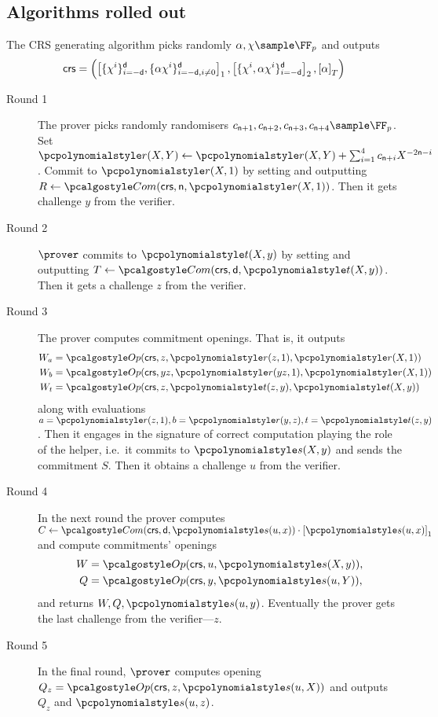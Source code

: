\let\accentvec\vec \documentclass[runningheads]{llncs}
\begin{document}
	\subsection{Algorithms rolled out}
	The CRS generating algorithm picks randomly $\alpha, \chi \sample \FF_p$ and
	outputs 
	\[
		\mathsf{crs} = \left( \left[\{\chi^i\}_{i = -\mathsf{d}}^{\mathsf{d}},
			\{\alpha \chi^i\}_{i = -\mathsf{d}, i \neq 0}^{\mathsf{d}}\right]_{1},
			\left[\{\chi^i, \alpha \chi^i\}_{i = - \mathsf{d}}^{\mathsf{d}}\right]_{2},
		\left[\alpha\right]_{T} \right)
	\]
\begin{description}
	\item[Round 1]
		The prover picks randomly randomisers $c_{\multconstr + 1}, c_{\multconstr + 2},
		c_{\multconstr + 3}, c_{\multconstr + 4} \sample \FF_p$. Set $\pr(X, Y)
		\gets \pr(X, Y) + \sum_{i = 1}^4 c_{\multconstr + i} X^{- 2 \multconstr -
		i}$. Commit to $\pr(X, 1)$ by setting and outputting $R \gets \com(\crs, \multconstr,
		\pr(X, 1))$.
		Then it gets challenge $y$ from the verifier.
	\item[Round 2] $\prover$ commits to $\pt(X, y)$ by setting and outputting $T
		\gets \com(\crs, \dconst, \pt(X, y))$. Then it gets a challenge $z$ from
		the verifier.
	\item[Round 3] The prover computes commitment openings. That is, it outputs
		\begin{align*}
			W_a & = \open(\crs, z, \pr(z, 1), \pr(X, 1)) \\
			W_b & = \open(\crs, yz, \pr(yz, 1), \pr(X, 1)) \\
			W_t & = \open(\crs, z, \pt(z, y), \pt(X, y)) 
		\end{align*}
		along with evaluations $a = \pr(z, 1), b = \pr(y, z), t = \pt(z, y)$.
		Then it engages in the signature of correct computation playing the role of
		the helper, i.e.~it commits to $\p{s}(X, y)$ and sends the commitment $S$.
		Then it obtains a challenge $u$ from the verifier.
	\item[Round 4] In the next round the prover computes $C \gets \com(\crs,
		\dconst, \p{s}(u, x)) \cdot \gone{\p{s}(u, x)}$ and compute commitments'
		openings 
		\begin{align*}
			W & = \open(\crs, u, \p{s}(X, y)), \\
			Q & = \open(\crs, y, \p{s}(u, Y)),
		\end{align*}
		and returns $W, Q, \p{s}(u, y)$. Eventually the prover gets the last
		challenge from the verifier---$z$.
	\item[Round 5] In the final round, $\prover$ computes opening $Q_z =
		\open(\crs, z, \p{s}(u, X))$ and outputs $Q_z$ and $\p{s}(u, z)$. 
\end{description}
\end{document}
